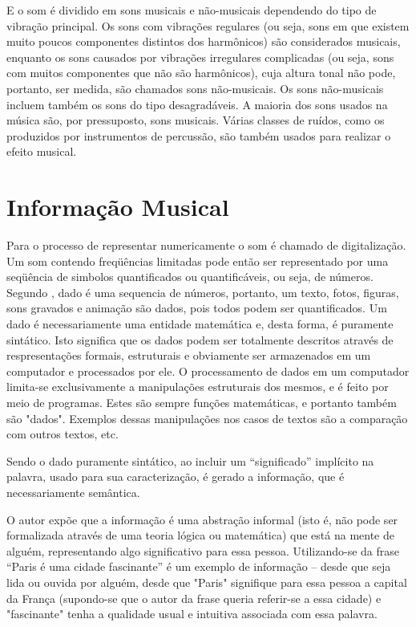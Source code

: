 E o som é dividido em sons musicais e não-musicais dependendo do tipo de vibração principal. Os sons com vibrações regulares (ou seja, sons em que existem muito poucos componentes distintos dos harmônicos) são considerados musicais, enquanto os sons causados por vibrações irregulares complicadas (ou seja, sons com muitos componentes que não são harmônicos), cuja altura tonal não pode, portanto, ser medida, são chamados sons não-musicais. Os sons não-musicais incluem também os sons do tipo desagradáveis. A maioria dos sons usados na música são, por pressuposto, sons musicais. Várias classes de ruídos, como os produzidos por instrumentos de percussão, são também usados para realizar o efeito musical.

\section{Informação Musical}
Para  o processo de representar numericamente o som é chamado de digitalização. Um som contendo freqüências limitadas pode então ser representado por uma seqüência de simbolos quantificados ou quantificáveis, ou seja, de números. Segundo  , dado é uma sequencia de números, portanto, um texto, fotos, figuras, sons gravados e animação são dados, pois todos podem ser quantificados. Um dado é necessariamente uma entidade matemática e, desta forma, é puramente sintático. Isto significa que os dados podem ser totalmente descritos através de respresentações formais, estruturais e obviamente ser armazenados em um computador e processados por ele. O processamento de dados em um computador limita-se exclusivamente a manipulações estruturais dos mesmos, e é feito por meio de programas. Estes são sempre funções matemáticas, e portanto também são "dados". Exemplos dessas manipulações nos casos de textos são a comparação com outros textos, etc.

Sendo o dado puramente sintático, ao incluir um “significado” implícito na palavra, usado para sua caracterização, é gerado a informação, que é necessariamente semântica.

O autor expõe que a informação é uma abstração informal (isto é, não pode ser formalizada através de uma teoria lógica ou matemática) que está na mente de alguém, representando algo significativo para essa pessoa. Utilizando-se da frase “Paris é uma cidade fascinante” é um exemplo de informação – desde que seja lida ou ouvida por alguém, desde que "Paris" signifique para essa pessoa a capital da França (supondo-se que o autor da frase queria referir-se a essa cidade) e "fascinante" tenha a qualidade usual e intuitiva associada com essa palavra.


